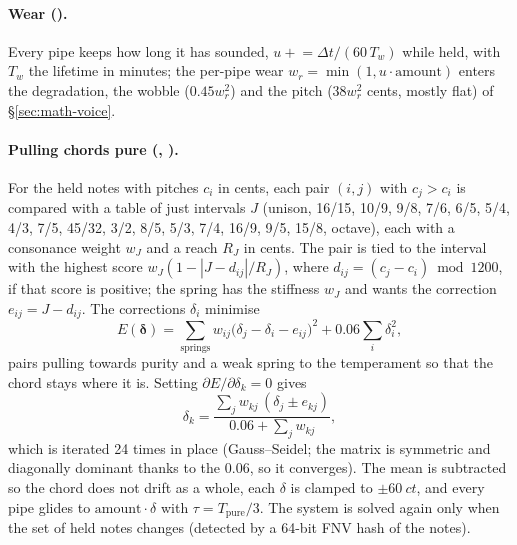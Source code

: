 \paragraph{Wear ().} Every pipe keeps how long it has sounded, $u \mathrel{+}= \Delta t/(60\,T_w)$ while held,
with $T_w$ the lifetime in minutes; the per-pipe wear $w_r = \min(1, u\cdot\text{amount})$ enters the degradation, the
wobble ($0.45w_r^2$) and the pitch ($38w_r^2$ cents, mostly flat) of \S\ref{sec:math-voice}.

\paragraph{Pulling chords pure (, ).} For the held notes with pitches $c_i$ in cents, each pair
$(i,j)$ with $c_j > c_i$ is compared with a table of just intervals $J$ (unison, 16/15, 10/9, 9/8, 7/6, 6/5, 5/4, 4/3,
7/5, 45/32, 3/2, 8/5, 5/3, 7/4, 16/9, 9/5, 15/8, octave), each with a consonance weight $w_J$ and a reach $R_J$ in cents. The
pair is tied to the interval with the highest score $w_J(1 - |J - d_{ij}|/R_J)$, where $d_{ij} = (c_j-c_i)\bmod 1200$, if
that score is positive; the spring has the stiffness $w_J$ and wants the correction $e_{ij} = J - d_{ij}$. The
corrections $\delta_i$ minimise
\begin{equation}
  E(\boldsymbol\delta) = \sum_{\text{springs}} w_{ij}\bigl(\delta_j - \delta_i - e_{ij}\bigr)^2 + 0.06\sum_i \delta_i^2 ,
\end{equation}
pairs pulling towards purity and a weak spring to the temperament so that the chord stays where it is. Setting
$\partial E/\partial\delta_k = 0$ gives
\begin{equation}
  \delta_k = \frac{\sum_{j} w_{kj}\,(\delta_j \pm e_{kj})}{0.06 + \sum_j w_{kj}},
\end{equation}
which is iterated 24 times in place (Gauss--Seidel; the matrix is symmetric and diagonally dominant thanks to the
$0.06$, so it converges). The mean is subtracted so the chord does not drift as a whole, each $\delta$ is clamped to
$\pm\SI{60}{ct}$, and every pipe glides to $\text{amount}\cdot\delta$ with $\tau = T_\mathrm{pure}/3$. The system is
solved again only when the set of held notes changes (detected by a 64-bit FNV hash of the notes).

